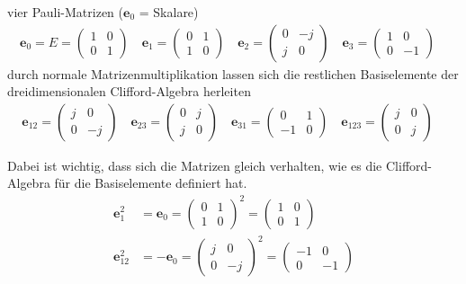 \begin{definition} \label{def:defPauli}
	vier Pauli-Matrizen ($\mathbf{e}_0$ = Skalare)
	\begin{align}
		\mathbf{e}_0 = E = 
		\begin{pmatrix}
			1 & 0 \\
			0 & 1
		\end{pmatrix}\quad
		\mathbf{e}_1 =
		\begin{pmatrix}
			0 & 1 \\
			1 & 0
		\end{pmatrix}\quad
		\mathbf{e}_2 =
		\begin{pmatrix}
			0 & -j \\
			j & 0
		\end{pmatrix}\quad
		\mathbf{e}_3 =
		\begin{pmatrix}
			1 & 0 \\
			0 & -1
		\end{pmatrix}\quad	
	\end{align}
	durch normale Matrizenmultiplikation lassen sich die restlichen Basiselemente der dreidimensionalen Clifford-Algebra herleiten
	\begin{align}
		\mathbf{e}_{12} =  
		\begin{pmatrix}
			j & 0 \\
			0 & -j
		\end{pmatrix}\quad
		\mathbf{e}_{23} =
		\begin{pmatrix}
			0 & j \\
			j & 0
		\end{pmatrix}\quad
		\mathbf{e}_{31} =
		\begin{pmatrix}
			0 & 1 \\
			-1 & 0
		\end{pmatrix}\quad
		\mathbf{e}_{123} =
		\begin{pmatrix}
			j & 0 \\
			0 & j
		\end{pmatrix}\quad	
	\end{align}
\end{definition}
Dabei ist wichtig, dass sich die Matrizen gleich verhalten, wie es die Clifford-Algebra für die Basiselemente definiert hat.
\begin{align}
	\mathbf{e}_1^2 &= \mathbf{e}_0 =
	\begin{pmatrix}
		0 & 1 \\
		1 & 0
	\end{pmatrix}^2 = 
	\begin{pmatrix}
		1 & 0 \\
		0 & 1
	\end{pmatrix}\\
	\mathbf{e}_{12}^2 &= -\mathbf{e}_0 =
	\begin{pmatrix}
		j & 0 \\
		0 & -j
	\end{pmatrix}^2 = 
	\begin{pmatrix}
		-1 & 0 \\
		0 & -1
	\end{pmatrix}
\end{align}
